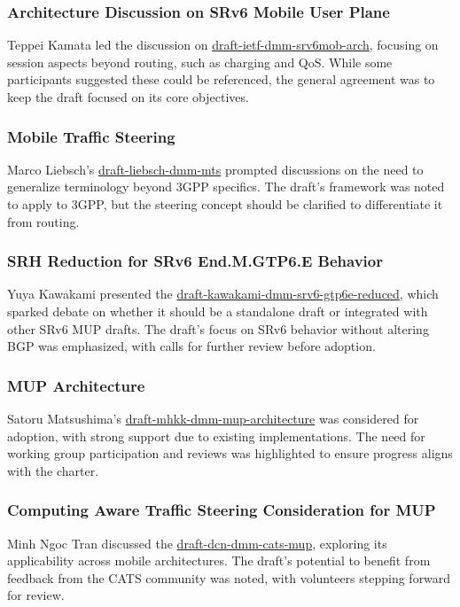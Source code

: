 \documentclass{article}
\begin{document}
\subsubsection{Architecture Discussion on SRv6 Mobile User Plane}
Teppei Kamata led the discussion on \href{https://datatracker.ietf.org/doc/draft-ietf-dmm-srv6mob-arch/}{draft-ietf-dmm-srv6mob-arch}, focusing on session aspects beyond routing, such as charging and QoS. While some participants suggested these could be referenced, the general agreement was to keep the draft focused on its core objectives.

\subsubsection{Mobile Traffic Steering}
Marco Liebsch's \href{https://datatracker.ietf.org/doc/draft-liebsch-dmm-mts}{draft-liebsch-dmm-mts} prompted discussions on the need to generalize terminology beyond 3GPP specifics. The draft's framework was noted to apply to 3GPP, but the steering concept should be clarified to differentiate it from routing.

\subsubsection{SRH Reduction for SRv6 End.M.GTP6.E Behavior}
Yuya Kawakami presented the \href{https://datatracker.ietf.org/doc/draft-kawakami-dmm-srv6-gtp6e-reduced}{draft-kawakami-dmm-srv6-gtp6e-reduced}, which sparked debate on whether it should be a standalone draft or integrated with other SRv6 MUP drafts. The draft's focus on SRv6 behavior without altering BGP was emphasized, with calls for further review before adoption.

\subsubsection{MUP Architecture}
Satoru Matsushima's \href{https://datatracker.ietf.org/doc/draft-mhkk-dmm-mup-architecture}{draft-mhkk-dmm-mup-architecture} was considered for adoption, with strong support due to existing implementations. The need for working group participation and reviews was highlighted to ensure progress aligns with the charter.

\subsubsection{Computing Aware Traffic Steering Consideration for MUP}
Minh Ngoc Tran discussed the \href{https://datatracker.ietf.org/doc/html/draft-dcn-dmm-cats-mup}{draft-dcn-dmm-cats-mup}, exploring its applicability across mobile architectures. The draft's potential to benefit from feedback from the CATS community was noted, with volunteers stepping forward for review.
\end{document}
